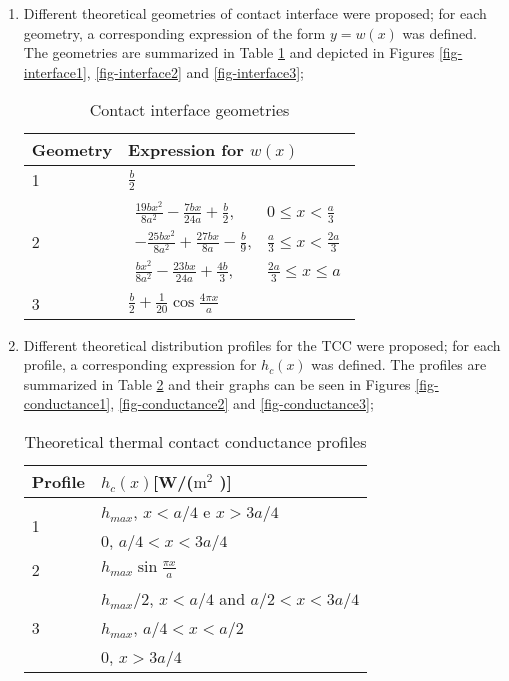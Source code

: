 \documentclass[conference,compsoc,fleqn]{IEEEtran}
\begin{document}
\begin{enumerate}
	\item Different theoretical geometries of contact interface were proposed; for each geometry, a corresponding expression of the form $y = w(x)$ was defined. The geometries are summarized in Table \ref{tabela_interfaces} and depicted in Figures \ref{fig-interface1}, \ref{fig-interface2} and \ref{fig-interface3};
	
	\begin{table}[H]
		\centering
		\caption{Contact interface geometries}
		\begin{tabular}{|l|l|}
			\hline 
			\textbf{Geometry} & \textbf{Expression for} $w(x)$    \\ \hline
			1       & $\frac{b}{2}$   \\ \hline
			2       & $\begin{array}{ll}
			\frac{19bx^2}{8a^2}-\frac{7bx}{24a}+\frac{b}{2}, &  0 \le x < \frac{a}{3} \\
			-\frac{25bx^2}{8a^2}+\frac{27bx}{8a}-\frac{b}{9}, &  \frac{a}{3} \le x < \frac{2a}{3} \\ 
			\frac{bx^2}{8a^2}-\frac{23bx}{24a}+\frac{4b}{3}, &  \frac{2a}{3} \le x \le a
			\end{array}$     \\ \hline
			3       & $ \frac{b}{2} + \frac{1}{20} \cos\frac{4 \pi  x}{a}$ \\ \hline
		\end{tabular}			
		\label{tabela_interfaces}
	\end{table}

	\item Different theoretical distribution profiles for the TCC were proposed; for each profile, a corresponding expression for $h_c(x)$ was defined. The profiles are summarized in Table \ref{tabela_ctc} and their graphs can be seen in Figures \ref{fig-conductance1}, \ref{fig-conductance2} and \ref{fig-conductance3};
	
	\begin{table}[H]
		\centering
		\caption{Theoretical thermal contact conductance profiles}
		\begin{tabular}{|l|l|}
			\hline
			\textbf{Profile} & $h_c(x)$[W/($\text{m}^2$ \celsius)]  \\ \hline
			\multirow{2}{*}{1} & $h_{max}$, $x < a/4$ e $x > 3a/4$ \\ & 0, $a/4 < x < 3a/4$ \\ \hline
			2 & $h_{max}\sin\frac{\pi x}{a}$ \\ \hline
			\multirow{3}{*}{3} & $h_{max}/2$, $x < a/4$ and $a/2 < x < 3a/4$ \\ & $h_{max}$, $a/4 < x < a/2$ \\ & 0, $ x > 3a/4$
			\\ \hline
		\end{tabular}			
		\label{tabela_ctc}
	\end{table}


\end{enumerate}
\end{document}
